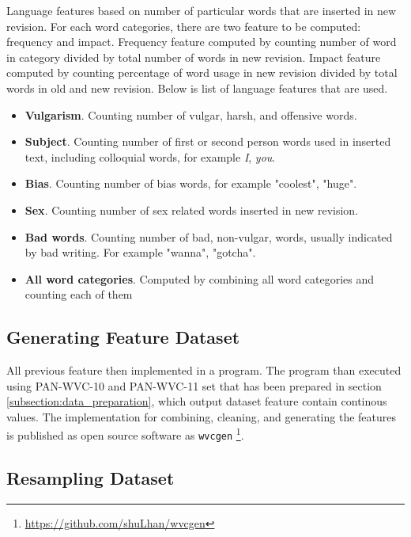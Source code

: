 \documentclass[conference,compsoc,a4paper,twocolumn,final]{IEEEtran}
\begin{document}
Language features based on number of particular words that are inserted in new
revision.
For each word categories, there are two feature to be computed: frequency and
impact.
Frequency feature computed by counting number of word in category divided by
total number of words in new revision.
Impact feature computed by counting percentage of word usage in new revision
divided by total words in old and new revision.
Below is list of language features that are used.

\begin{itemize}
\item \textbf{Vulgarism}. Counting number of vulgar, harsh, and offensive
words.
\item \textbf{Subject}. Counting number of first or second person
words used in inserted text, including colloquial words, for example
\textit{I}, \textit{you}.
\item \textbf{Bias}. Counting number of bias words, for example "coolest",
"huge".
\item \textbf{Sex}. Counting number of sex related words inserted in new
revision.
\item \textbf{Bad words}. Counting number of bad, non-vulgar, words, usually
indicated by bad writing. For example "wanna", "gotcha".
\item \textbf{All word categories}. Computed by combining all word categories
and counting each of them
\end{itemize}


\subsection{Generating Feature Dataset}

All previous feature then implemented in a program.
The program than executed using PAN-WVC-10 and PAN-WVC-11 set that has been
prepared in section \ref{subsection:data_preparation}, which output dataset
feature contain continous values.
The implementation for combining, cleaning, and generating the features is
published as open source software as \texttt{wvcgen}
\footnote{\url{https://github.com/shuLhan/wvcgen}}.


\subsection{Resampling Dataset}
\end{document}
